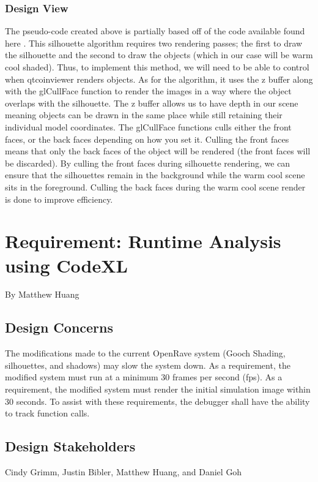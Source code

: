 ﻿\documentclass[10pt,journal,compsoc,draftclsnofoot]{IEEEtran}
\begin{document}
\begin{flushleft}
\subsubsection{Design View}
The pseudo-code created above is partially based off of the code available found here \cite{siledges}.
This silhouette algorithm requires two rendering passes; the first to draw the silhouette and the second to draw the objects (which in our case will be warm cool shaded).
Thus, to implement this method, we will need to be able to control when qtcoinviewer renders objects.
As for the algorithm, it uses the z buffer along with the glCullFace function to render the images in a way where the object overlaps with the silhouette.
The z buffer allows us to have depth in our scene meaning objects can be drawn in the same place while still retaining their individual model coordinates.
The glCullFace functions culls either the front faces, or the back faces depending on how you set it.
Culling the front faces means that only the back faces of the object will be rendered (the front faces will be discarded).
By culling the front faces during silhouette rendering, we can ensure that the silhouettes remain in the background while the warm cool scene sits in the foreground.
Culling the back faces during the warm cool scene render is done to improve efficiency. 
\newpage

\section{Requirement: Runtime Analysis using CodeXL}
\large{By Matthew Huang}

\normalsize
\subsection{Design Concerns}
The modifications made to the current OpenRave system (Gooch Shading, silhouettes, and shadows) may slow the system down.
As a requirement, the modified system must run at a minimum 30 frames per second (fps).
As a requirement, the modified system must render the initial simulation image within 30 seconds.
To assist with these requirements, the debugger shall have the ability to track function calls.

\subsection{Design Stakeholders}
Cindy Grimm, Justin Bibler, Matthew Huang, and Daniel Goh


\end{flushleft}
\end{document}
